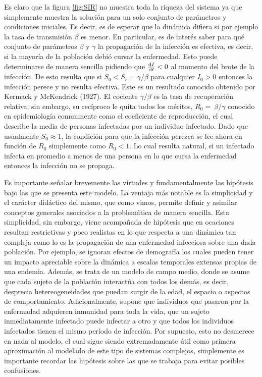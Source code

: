Es claro que la figura \ref{fig:SIR} no muestra toda la riqueza del sistema ya que simplemente muestra la solución para un solo conjunto de parámetros y 
condiciones iniciales. Es decir, es de esperar que la dinámica difiera si por ejemplo la tasa de transmisión $\beta$ es menor. En particular, es de 
interés saber para qué conjunto de parámetros $\beta$ y $\gamma$ la propagación de la infección es efectiva, es decir, si la mayoría de la población debió cursar la 
enfermedad. Esto puede determinarse de manera sencilla pidiendo que $\dv{I}{t}<0$ al momento del brote de la infección. De esto resulta que si $S_0<S_c=\gamma/\beta$ 
para cualquier $I_0>0$ entonces la infección perece y no resulta efectiva. Este es un resultado conocido obtenido por Kermack y McKendrick (1927).\cite{SIR}
El cociente $\gamma/\beta$ es la tasa de recuperación relativa, sin embargo, su recíproco le quita todos los méritos, $R_0=~\beta/\gamma$ 
conocido en epidemiología comunmente como el coeficiente de reproducción, el cual describe la media de personas infectadas por un individuo 
infectado. Dado que usualmente $S_0\approx 1$, la condición para que la infección perezca se lee ahora en función de $R_0$
simplemente como $R_0<1$. Lo cual resulta natural, si un infectado infecta en promedio a menos de una persona en lo que cursa la enfermedad entonces 
la infección no se propaga.


Es importante señalar brevemente las virtudes y fundamentalmente las hipótesis bajo las que se presenta este modelo. La ventaja más notable es la 
simplicidad y el carácter didáctico del mismo, que como vimos, permite definir y asimilar conceptos generales asociados a la problemática de manera sencilla.
Esta simplicidad, sin embargo, viene acompañada de hipótesis que en ocaciones resultan restrictivas y poco realistas en lo que respecta a una dinámica
tan compleja como lo es la propagación de una enfermedad infecciosa sobre una dada población. Por ejemplo, se ignoran efectos de demografía los cuales
pueden tener un impacto apreciable sobre la dinámica a escalas temporales extensas propias de una endemia. Además, se trata de un modelo de campo medio, 
donde se asume que cada sujeto de la población interactúa con todos los demás, es decir, desprecia hetereogeneidades que puedan surgir de la edad, el 
espacio o aspectos de comportamiento. Adicionalmente, supone que individuos que pasaron por la enfermadad adquieren inmunidad para toda la vida, que
un sujeto inmediatamente infectado puede infectar a otro y que todos los individuos infectados tienen el mismo período de infección. Por supuesto, esto 
no desmerece en nada al modelo, el cual sigue siendo extremadamente útil como primera aproximación al modelado de este tipo de sistemas complejos,
simplemente es importante recordar las hipótesis sobre las que se trabaja para evitar posibles confusiones.

